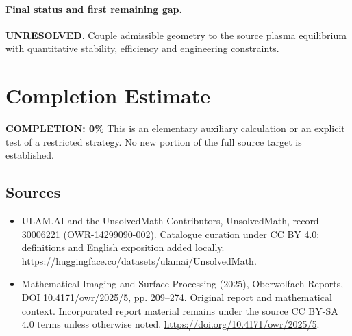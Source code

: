\documentclass[11pt]{article}
\begin{document}
\paragraph{Final status and first remaining gap.}
\textbf{UNRESOLVED}. Couple admissible geometry to the source plasma equilibrium with quantitative stability, efficiency and engineering constraints.

\section{Completion Estimate}
\noindent\textbf{COMPLETION: 0\%}
This is an elementary auxiliary calculation or an explicit test of a restricted strategy. No new portion of the full source target is established.

\subsection{Sources}
\begin{itemize}
\item[\hypertarget{source:30006221:1}{S1}] ULAM.AI and the UnsolvedMath Contributors, UnsolvedMath, record 30006221 (OWR-14299090-002). Catalogue curation under CC BY 4.0; definitions and English exposition added locally.
\url{https://huggingface.co/datasets/ulamai/UnsolvedMath}.
\item[\hypertarget{source:30006221:2}{S2}] Mathematical Imaging and Surface Processing (2025), Oberwolfach Reports, DOI 10.4171/owr/2025/5, pp. 209--274. Original report and mathematical context. Incorporated report material remains under the source CC BY-SA 4.0 terms unless otherwise noted.
\url{https://doi.org/10.4171/owr/2025/5}.
\end{itemize}
\label{end:30006221}
\end{document}

